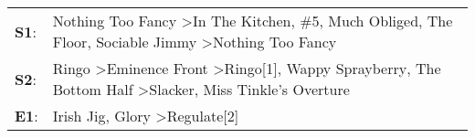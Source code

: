 \begin{supertabular}{p{0.03\textwidth}p{0.92\textwidth}}
 \textbf{S1}:  &               Nothing Too Fancy\textsuperscript{} \textgreater \enspace In The Kitchen\textsuperscript{}, \enspace \#5\textsuperscript{}, \enspace Much Obliged\textsuperscript{}, \enspace The Floor\textsuperscript{}, \enspace Sociable Jimmy\textsuperscript{} \textgreater \enspace Nothing Too Fancy\textsuperscript{}  \enspace  \\
 \textbf{S2}:  &  Ringo\textsuperscript{} \textgreater \enspace Eminence Front\textsuperscript{} \textgreater \enspace Ringo[1]\textsuperscript{}, \enspace Wappy Sprayberry\textsuperscript{}, \enspace The Bottom Half\textsuperscript{} \textgreater \enspace Slacker\textsuperscript{}, \enspace Miss Tinkle's Overture\textsuperscript{}  \enspace  \\
 \textbf{E1}:  &                                                                                                                                                                                                            Irish Jig\textsuperscript{}, \enspace Glory\textsuperscript{} \textgreater \enspace Regulate[2]\textsuperscript{}  \enspace  \\
\end{supertabular}
